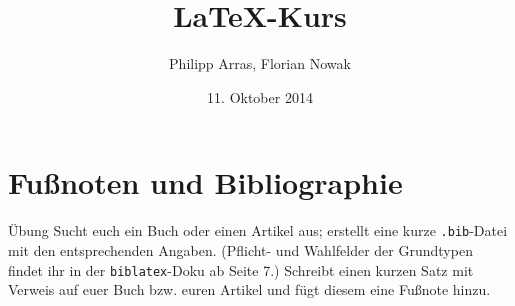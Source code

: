 \documentclass[11pt]{beamer}
\author{Philipp Arras, Florian Nowak}
\title{\LaTeX -Kurs}
\date{11. Oktober 2014}
\begin{document}


\section{Fußnoten und Bibliographie}
\begin{frame}{Übung}
Sucht euch ein Buch oder einen Artikel aus; erstellt eine kurze \texttt{.bib}-Datei mit den entsprechenden Angaben. (Pflicht- und Wahlfelder der Grundtypen findet ihr in der \texttt{biblatex}-Doku ab Seite 7.) Schreibt einen kurzen Satz mit Verweis auf euer Buch bzw. euren Artikel und fügt diesem eine Fußnote hinzu.
\end{frame}
\end{document}
